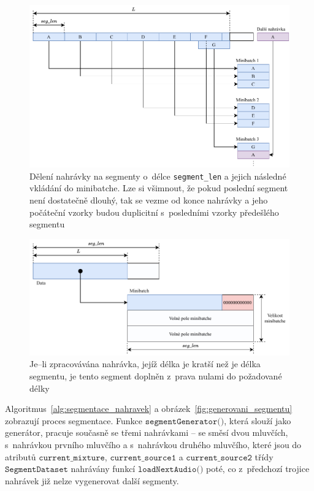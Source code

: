 \begin{figure}[H]
    \centering
    \includegraphics[scale=0.9]{obrazky-figures/minibatch_segmentace.pdf}
    \caption{\label{fig:minibatch_segmentace}Dělení nahrávky na segmenty o~délce \texttt{segment\_len} a jejich následné vkládání do minibatche. Lze si všimnout, že pokud poslední segment není dostatečně dlouhý, tak se vezme od konce nahrávky a jeho počáteční vzorky budou duplicitní s~posledními vzorky předešlého segmentu}
\end{figure}

\begin{figure}[H]
    \centering
    \includegraphics[scale=0.9]{obrazky-figures/minibatch_segmentace_padding.pdf}
    \caption{\label{fig:segmentace_padding}Je--li zpracovávána nahrávka, jejíž délka je kratší než je délka segmentu, je tento segment doplněn z~prava nulami do požadované délky}
\end{figure}

Algoritmus~\ref{alg:segmentace_nahravek} a obrázek~\ref{fig:generovani_segmentu} zobrazují proces segmentace. Funkce $\texttt{segmentGenerator()}$, která slouží jako generátor, pracuje současně se třemi nahrávkami -- se směsí dvou mluvčích, s~nahrávkou prvního mluvčího a s~nahrávkou druhého mluvčího, které jsou do atributů $\texttt{current\_mixture}$, $\texttt{current\_source1}$ a $\texttt{current\_source2}$ třídy $\texttt{SegmentDataset}$ nahrávány funkcí $\texttt{loadNextAudio()}$ poté, co z~předchozí trojice nahrávek již nelze vygenerovat další segmenty.

